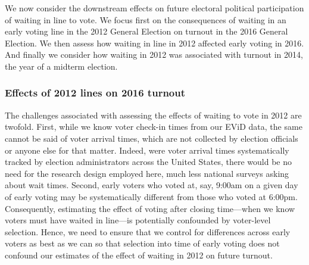 \documentclass[12pt,titlepage]{article}
\begin{document}
We now consider the downstream effects on future electoral political
participation of waiting in line to vote. We focus first on the
consequences of waiting in an early voting line in the 2012 General
Election on turnout in the 2016 General Election. We then assess how
waiting in line in 2012 affected early voting in 2016. And finally we
consider how waiting in 2012 was associated with turnout in 2014, the
year of a midterm election.

\subsubsection*{Effects of 2012 lines on 2016 turnout}

The challenges associated with assessing the effects of waiting to
vote in 2012 are twofold.  First, while we know voter check-in times
from our EViD data, the same cannot be said of voter arrival times,
which are not collected by election officials or anyone else for that
matter.  Indeed, were voter arrival times systematically tracked by
election administrators across the United States, there would be no
need for the research design employed here, much less national surveys
asking about wait times.  Second, early voters who voted at, say,
9:00am on a given day of early voting may be systematically different
from those who voted at 6:00pm. Consequently, estimating the effect of
voting after closing time---when we know voters must have waited in
line---is potentially confounded by voter-level selection.  Hence, we
need to ensure that we control for differences across early voters as
best as we can so that selection into time of early voting does not
confound our estimates of the effect of waiting in 2012 on future
turnout.



\end{document}
